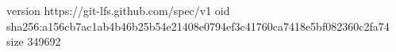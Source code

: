 version https://git-lfs.github.com/spec/v1
oid sha256:a156cb7ac1ab4b46b25b54e21408e0794ef3c41760ca7418e5bf082360c2fa74
size 349692
